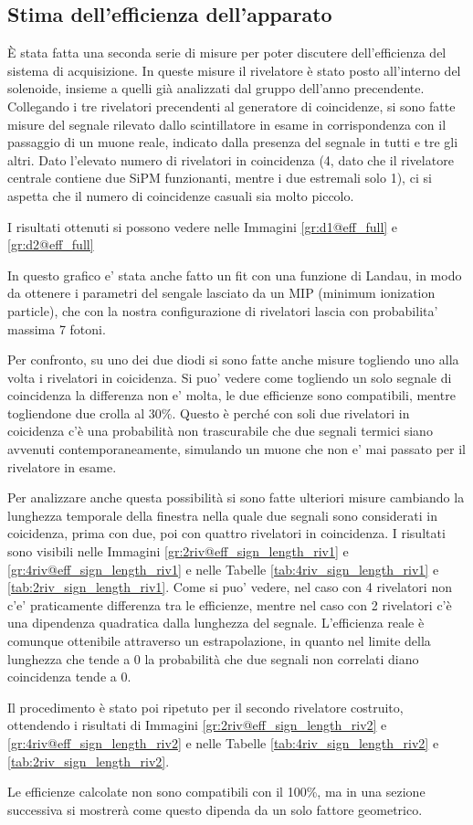\subsection{Stima dell'efficienza dell'apparato}
\`E stata fatta una seconda serie di misure per poter discutere dell'efficienza del sistema di acquisizione. In queste misure il rivelatore \`e stato posto all'interno del solenoide, insieme a quelli gi\`a analizzati dal gruppo dell'anno precendente. Collegando i tre rivelatori precendenti al generatore di coincidenze, si sono fatte misure del segnale rilevato dallo scintillatore in esame in corrispondenza con il passaggio di un muone reale, indicato dalla presenza del segnale in tutti e tre gli altri. Dato l'elevato numero di rivelatori in coincidenza (4, dato che il rivelatore centrale contiene due SiPM funzionanti, mentre i due estremali solo 1), ci si aspetta che il numero di coincidenze casuali sia molto piccolo.

I risultati ottenuti si possono vedere nelle Immagini \ref{gr:d1@eff_full} e \ref{gr:d2@eff_full}


In questo grafico e' stata anche fatto un fit con una funzione di Landau, in modo da ottenere i parametri del sengale lasciato da un MIP (minimum ionization particle), che con la nostra configurazione di rivelatori lascia con probabilita' massima 7 fotoni.

Per confronto, su uno dei due diodi si sono fatte anche misure togliendo uno alla volta i rivelatori in coicidenza. Si puo' vedere come togliendo un solo segnale di coincidenza la differenza non e' molta, le due efficienze sono compatibili, mentre togliendone due crolla al 30\%. Questo \`e perch\'e con soli due rivelatori in coicidenza c'\`e una probabilit\`a non trascurabile che due segnali termici siano avvenuti contemporaneamente, simulando un muone che non e' mai passato per il rivelatore in esame.

Per analizzare anche questa possibilit\`a si sono fatte ulteriori misure cambiando la lunghezza temporale della finestra nella quale due segnali sono considerati in coicidenza, prima con due, poi con quattro rivelatori in coincidenza. I risultati sono visibili nelle Immagini \ref{gr:2riv@eff_sign_length_riv1} e \ref{gr:4riv@eff_sign_length_riv1} e nelle Tabelle \ref{tab:4riv_sign_length_riv1} e \ref{tab:2riv_sign_length_riv1}.
Come si puo' vedere, nel caso con 4 rivelatori non c'e' praticamente differenza tra le efficienze, mentre nel caso con 2 rivelatori c'\`e una dipendenza quadratica dalla lunghezza del segnale. L'efficienza reale \`e comunque ottenibile attraverso un estrapolazione, in quanto nel limite della lunghezza che tende a 0 la probabilit\`a che due segnali non correlati diano coincidenza tende a 0.

Il procedimento \`e stato poi ripetuto per il secondo rivelatore costruito, ottendendo i risultati di Immagini \ref{gr:2riv@eff_sign_length_riv2} e \ref{gr:4riv@eff_sign_length_riv2} e nelle Tabelle \ref{tab:4riv_sign_length_riv2} e \ref{tab:2riv_sign_length_riv2}.

Le efficienze calcolate non sono compatibili con il 100\%, ma in una sezione successiva si mostrer\`a come questo dipenda da un solo fattore geometrico.
